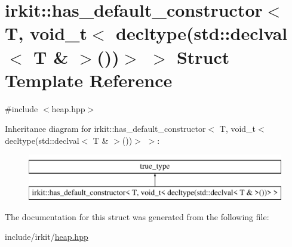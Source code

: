 \hypertarget{structirkit_1_1has__default__constructor_3_01T_00_01void__t_3_01decltype_07std_1_1declval_3_01T_01_6_01_4_07_08_08_4_01_4}{}\section{irkit\+:\+:has\+\_\+default\+\_\+constructor$<$ T, void\+\_\+t$<$ decltype(std\+:\+:declval$<$ T \& $>$())$>$ $>$ Struct Template Reference}
\label{structirkit_1_1has__default__constructor_3_01T_00_01void__t_3_01decltype_07std_1_1declval_3_01T_01_6_01_4_07_08_08_4_01_4}


{\ttfamily \#include $<$heap.\+hpp$>$}

Inheritance diagram for irkit\+:\+:has\+\_\+default\+\_\+constructor$<$ T, void\+\_\+t$<$ decltype(std\+:\+:declval$<$ T \& $>$())$>$ $>$\+:\begin{figure}[H]
\begin{center}
\leavevmode
\includegraphics[height=2.000000cm]{structirkit_1_1has__default__constructor_3_01T_00_01void__t_3_01decltype_07std_1_1declval_3_01T_01_6_01_4_07_08_08_4_01_4}
\end{center}
\end{figure}


The documentation for this struct was generated from the following file\+:\begin{DoxyCompactItemize}
\item 
include/irkit/\mbox{\hyperlink{heap_8hpp}{heap.\+hpp}}\end{DoxyCompactItemize}
